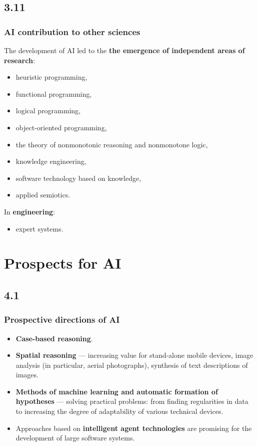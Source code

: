 \documentclass[default]{beamer}
\begin{document}
	\subsection{3.11}
	\begin{frame}
		\frametitle{AI contribution to other sciences}
		
		The development of AI led to the \textbf {the emergence of independent areas of research}:
		\begin{itemize}
			\item heuristic programming,
			\item functional programming,
			\item logical programming,
			\item object-oriented programming,
			\item the theory of nonmonotonic reasoning and nonmonotone logic,
			\item knowledge engineering,
			\item software technology based on knowledge,
			\item applied semiotics.
		\end{itemize}
		
		In \textbf{engineering}:
		\begin{itemize}
			\item expert systems.
		\end{itemize}
	\end{frame}

	\section{Prospects for AI}
	\subsection{4.1}
	\begin{frame}
		\frametitle{Prospective directions of AI}
		
		\begin{itemize}
			\item \textbf {Case-based reasoning}.
			\item \textbf {Spatial reasoning} --- increasing value for stand-alone mobile devices, image analysis (in particular, aerial photographs), synthesis of text descriptions of images.
			\item \textbf {Methods of machine learning and automatic formation of hypotheses} --- solving practical problems: from finding regularities in data to increasing the degree of adaptability of various technical devices.
			\item Approaches based on \textbf {intelligent agent technologies} are promising for the development of large software systems.
			
		\end{itemize}
		
	\end{frame}
\end{document}
